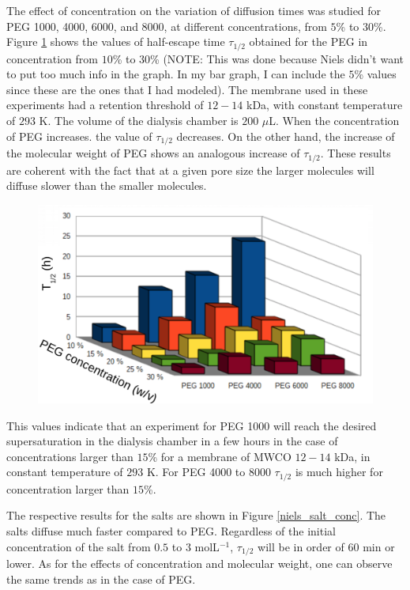 \documentclass[11ptm,oneside,a4paper]{report}
\begin{document}
The effect of concentration on the variation of diffusion times was studied for PEG 1000, 
4000, 6000, and 8000, at different concentrations, from $5$\% to $30$\%. Figure 
\ref{niels_peg_conc} shows the values of half-escape time $\tau_{1/2}$ obtained 
for the PEG in concentration from $10$\% to $30$\% (NOTE: This was done because Niels
didn't want to put too much info in the graph. In my bar graph, I can include the $5$\% values 
since these are the ones that I had modeled). The membrane used in these experiments had a 
retention threshold of $12-14$ kDa, with constant temperature of $293$ K. The volume of the
dialysis chamber is $200$ $\mu$L. When the concentration of PEG increases. the value of 
$\tau_{1/2}$ decreases. On the other hand, the increase of the molecular weight of PEG shows
an analogous increase of $\tau_{1/2}$. These results are coherent with the fact that at a
given pore size the larger molecules will diffuse slower than the smaller molecules.
 
\begin{figure}[!htb]
  \begin{center}
      \includegraphics[scale=0.4]{figures/Niels-PEG-conc.png}
      \caption{\label{niels_peg_conc}}  
  \end{center} 
\end{figure}
\noindent
This values indicate that an experiment for PEG 1000 will reach the desired supersaturation in 
the dialysis chamber in a few hours in the case of concentrations larger than $15$\% for a 
membrane of MWCO $12-14$ kDa, in constant temperature of $293$ K. For PEG 4000 to 8000 
$\tau_{1/2}$ is much higher for concentration larger than $15$\%. 

The respective results for the salts are shown in Figure \ref{niels_salt_conc}. The salts diffuse much faster compared to PEG. Regardless of the initial concentration of the salt
from $0.5$ to $3$ molL$^{-1}$, $\tau_{1/2}$ will be in order of $60$ min or lower. 
As for the effects of concentration and molecular weight, one can observe the same trends 
as in the case of PEG.
\end{document}
